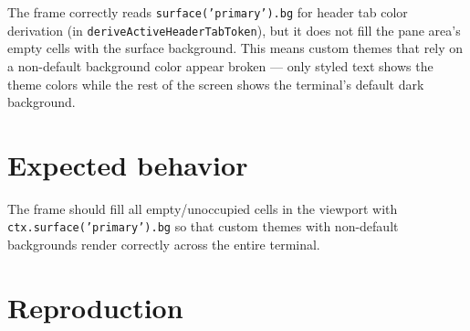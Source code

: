 The frame correctly reads \texttt{s\allowbreak{}u\allowbreak{}r\allowbreak{}f\allowbreak{}a\allowbreak{}c\allowbreak{}e\allowbreak{}(\allowbreak{}'\allowbreak{}p\allowbreak{}r\allowbreak{}i\allowbreak{}m\allowbreak{}a\allowbreak{}r\allowbreak{}y\allowbreak{}'\allowbreak{})\allowbreak{}.\allowbreak{}b\allowbreak{}g} for header tab color derivation (in \texttt{d\allowbreak{}e\allowbreak{}r\allowbreak{}i\allowbreak{}v\allowbreak{}e\allowbreak{}A\allowbreak{}c\allowbreak{}t\allowbreak{}i\allowbreak{}v\allowbreak{}e\allowbreak{}H\allowbreak{}e\allowbreak{}a\allowbreak{}d\allowbreak{}e\allowbreak{}r\allowbreak{}T\allowbreak{}a\allowbreak{}b\allowbreak{}T\allowbreak{}o\allowbreak{}k\allowbreak{}e\allowbreak{}n}), but it does not fill the pane area's empty cells with the surface background. This means custom themes that rely on a non-default background color appear broken --- only styled text shows the theme colors while the rest of the screen shows the terminal's default dark background.

\section{Expected behavior}\label{record-366-expected-behavior}

The frame should fill all empty/unoccupied cells in the viewport with \texttt{c\allowbreak{}t\allowbreak{}x\allowbreak{}.\allowbreak{}s\allowbreak{}u\allowbreak{}r\allowbreak{}f\allowbreak{}a\allowbreak{}c\allowbreak{}e\allowbreak{}(\allowbreak{}'\allowbreak{}p\allowbreak{}r\allowbreak{}i\allowbreak{}m\allowbreak{}a\allowbreak{}r\allowbreak{}y\allowbreak{}'\allowbreak{})\allowbreak{}.\allowbreak{}b\allowbreak{}g} so that custom themes with non-default backgrounds render correctly across the entire terminal.

\section{Reproduction}\label{record-366-reproduction}


